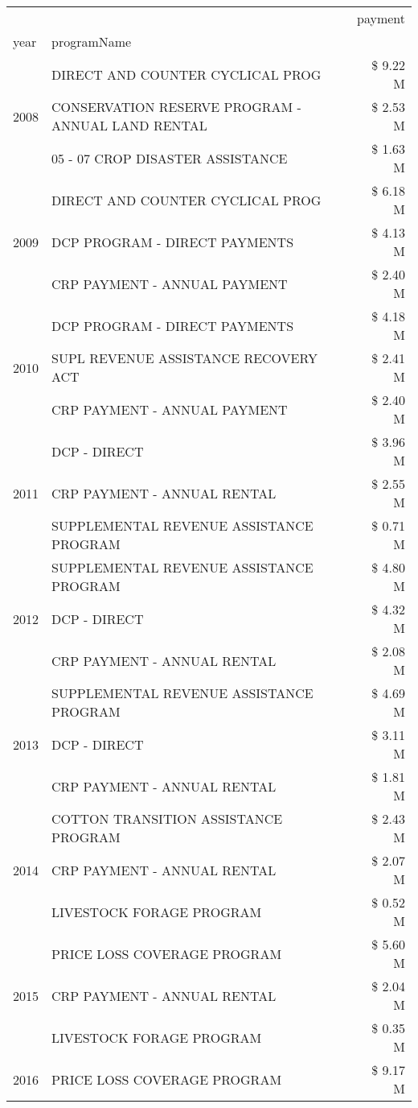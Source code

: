 \begin{tabular}{llr}
\toprule
 &  & payment \\
year & programName &  \\
\midrule
\multirow[t]{3}{*}{2008} & DIRECT AND COUNTER CYCLICAL PROG & \$ 9.22 M \\
 & CONSERVATION RESERVE PROGRAM - ANNUAL LAND RENTAL & \$ 2.53 M \\
 & 05 - 07 CROP DISASTER ASSISTANCE & \$ 1.63 M \\
\cline{1-3}
\multirow[t]{3}{*}{2009} & DIRECT AND COUNTER CYCLICAL PROG & \$ 6.18 M \\
 & DCP PROGRAM - DIRECT PAYMENTS & \$ 4.13 M \\
 & CRP PAYMENT - ANNUAL PAYMENT & \$ 2.40 M \\
\cline{1-3}
\multirow[t]{3}{*}{2010} & DCP PROGRAM - DIRECT PAYMENTS & \$ 4.18 M \\
 & SUPL REVENUE ASSISTANCE RECOVERY ACT & \$ 2.41 M \\
 & CRP PAYMENT - ANNUAL PAYMENT & \$ 2.40 M \\
\cline{1-3}
\multirow[t]{3}{*}{2011} & DCP - DIRECT & \$ 3.96 M \\
 & CRP PAYMENT - ANNUAL RENTAL & \$ 2.55 M \\
 & SUPPLEMENTAL REVENUE ASSISTANCE PROGRAM & \$ 0.71 M \\
\cline{1-3}
\multirow[t]{3}{*}{2012} & SUPPLEMENTAL REVENUE ASSISTANCE PROGRAM & \$ 4.80 M \\
 & DCP - DIRECT & \$ 4.32 M \\
 & CRP PAYMENT - ANNUAL RENTAL & \$ 2.08 M \\
\cline{1-3}
\multirow[t]{3}{*}{2013} & SUPPLEMENTAL REVENUE ASSISTANCE PROGRAM & \$ 4.69 M \\
 & DCP - DIRECT & \$ 3.11 M \\
 & CRP PAYMENT - ANNUAL RENTAL & \$ 1.81 M \\
\cline{1-3}
\multirow[t]{3}{*}{2014} & COTTON TRANSITION ASSISTANCE PROGRAM & \$ 2.43 M \\
 & CRP PAYMENT - ANNUAL RENTAL & \$ 2.07 M \\
 & LIVESTOCK FORAGE PROGRAM & \$ 0.52 M \\
\cline{1-3}
\multirow[t]{3}{*}{2015} & PRICE LOSS COVERAGE PROGRAM & \$ 5.60 M \\
 & CRP PAYMENT - ANNUAL RENTAL & \$ 2.04 M \\
 & LIVESTOCK FORAGE PROGRAM & \$ 0.35 M \\
\cline{1-3}
\multirow[t]{3}{*}{2016} & PRICE LOSS COVERAGE PROGRAM & \$ 9.17 M \\

\end{tabular}
